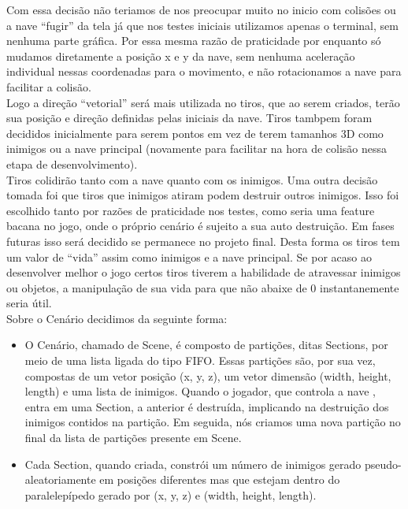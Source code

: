 \documentclass[12pt,a4paper]{article}
\begin{document}
	  	Com essa decisão não teriamos de nos preocupar muito no inicio com colisões ou a nave ``fugir''
		da tela já que nos testes iniciais utilizamos apenas o terminal, sem nenhuma parte gráfica. Por
		essa mesma razão de praticidade por enquanto só mudamos diretamente a posição x e y da nave,
		sem nenhuma aceleração individual nessas coordenadas para o movimento, e não rotacionamos a nave
		para facilitar a colisão.\\
		
	  	Logo a direção ``vetorial'' será mais utilizada no tiros, que ao serem criados, terão sua
		posição e direção definidas pelas iniciais da nave. Tiros tambpem foram decididos inicialmente
		para serem pontos em vez de terem tamanhos 3D como inimigos ou a nave principal (novamente para
		facilitar na hora de colisão nessa etapa de desenvolvimento).\\
		
    		Tiros colidirão tanto com a nave quanto com os inimigos. Uma outra decisão tomada foi que
		tiros que inimigos atiram podem destruir outros inimigos. Isso foi escolhido tanto por razões de
		praticidade nos testes, como seria uma feature bacana no jogo, onde o próprio cenário é sujeito
		a sua auto destruição. Em fases futuras isso será decidido se permanece no projeto final.
    		Desta forma os tiros tem um valor de ``vida'' assim como inimigos e a nave principal. Se por
		acaso ao desenvolver melhor o jogo certos tiros tiverem a habilidade de atravessar inimigos ou
		objetos, a manipulação de sua vida para que não abaixe de 0 instantanemente seria útil.\\
		
    		Sobre o Cenário decidimos da seguinte forma:
    		\begin{itemize}
    			\item O Cenário, chamado de Scene, é composto de partições, ditas Sections, por meio de uma lista
			ligada do tipo FIFO. Essas partições são, por sua vez, compostas de um vetor posição (x, y, z),
			um vetor dimensão (width, height, length) e uma lista de inimigos. Quando o jogador, que controla
			a nave , entra em uma Section, a anterior é destruída, implicando na destruição dos inimigos
			contidos na partição. Em seguida, nós criamos uma nova partição no final da lista de
			partições presente em Scene.
		
    			\item Cada Section, quando criada, constrói um número de inimigos gerado pseudo-aleatoriamente em
			posições diferentes mas que estejam dentro do paralelepípedo gerado por (x, y, z) e
			(width, height, length).	
    		\end{itemize}
    		
\end{document}
